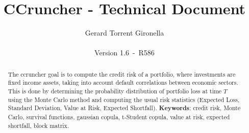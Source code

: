 \documentclass[a4paper,12pt,final]{article}
\def\numversion{1.6}
\def\svnversion{R586}
\begin{document}
\title{CCruncher - Technical Document}
\author{Gerard Torrent Gironella\\\\Version \numversion\ -\ \svnversion}
\date{}
\maketitle


\begin{abstract}
The ccruncher goal is to compute the credit risk of a portfolio, where 
investments are fixed income assets, taking into account default correlations
between economic sectors. This is done by determining the probability distribution 
of portfolio loss at time $T$ using the Monte Carlo method and computing the
usual risk statistics (Expected Loss, Standard Deviation, Value at Risk, Expected 
Shortfall).
\newline
\newline
\textbf{Keywords}: credit risk, Monte Carlo, survival functions, gaussian copula, 
t-Student copula, value at risk, expected shortfall, block matrix.
\end{abstract}
\newpage


\tableofcontents
\newpage

\end{document}

